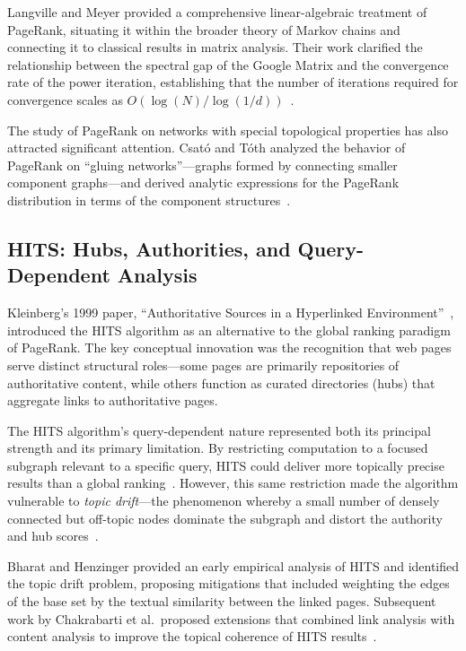 Langville and Meyer provided a comprehensive linear-algebraic treatment of PageRank, situating it within the broader theory of Markov chains and connecting it to classical results in matrix analysis. Their work clarified the relationship between the spectral gap of the Google Matrix and the convergence rate of the power iteration, establishing that the number of iterations required for convergence scales as $O(\log(N)/\log(1/d))$~\cite{pagerank_wikipedia}.

The study of PageRank on networks with special topological properties has also attracted significant attention. Csat\'o and T\'oth analyzed the behavior of PageRank on ``gluing networks''---graphs formed by connecting smaller component graphs---and derived analytic expressions for the PageRank distribution in terms of the component structures~\cite{mdpi_gluing}.


\subsection{HITS: Hubs, Authorities, and Query-Dependent Analysis}
\label{subsec:lit_hits}

Kleinberg's 1999 paper, ``Authoritative Sources in a Hyperlinked Environment''~\cite{kleinberg1999hits}, introduced the HITS algorithm as an alternative to the global ranking paradigm of PageRank. The key conceptual innovation was the recognition that web pages serve distinct structural roles---some pages are primarily repositories of authoritative content, while others function as curated directories (hubs) that aggregate links to authoritative pages.

The HITS algorithm's query-dependent nature represented both its principal strength and its primary limitation. By restricting computation to a focused subgraph relevant to a specific query, HITS could deliver more topically precise results than a global ranking~\cite{kleinberg1999hits}. However, this same restriction made the algorithm vulnerable to \textit{topic drift}---the phenomenon whereby a small number of densely connected but off-topic nodes dominate the subgraph and distort the authority and hub scores~\cite{ijarcce_comparative, ijca_hits_pagerank_2024}.

Bharat and Henzinger provided an early empirical analysis of HITS and identified the topic drift problem, proposing mitigations that included weighting the edges of the base set by the textual similarity between the linked pages. Subsequent work by Chakrabarti et al.\ proposed extensions that combined link analysis with content analysis to improve the topical coherence of HITS results~\cite{ijarcce_comparative}.


